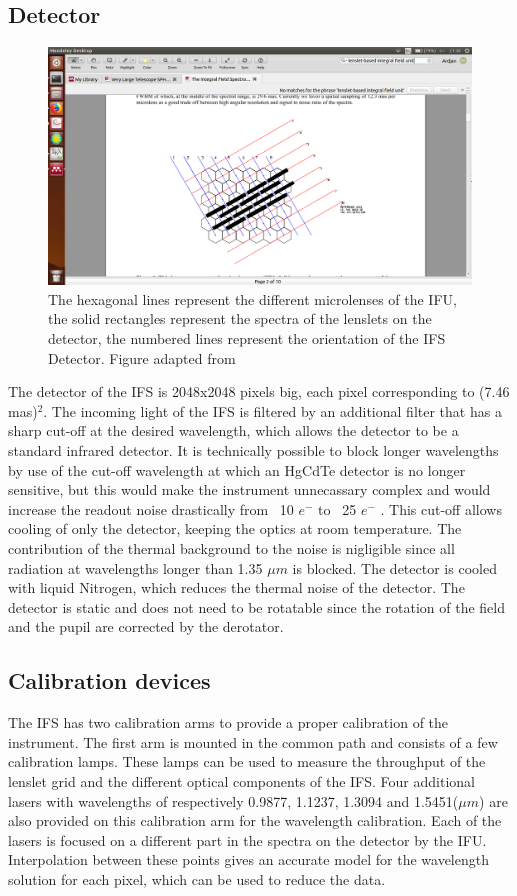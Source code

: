 \documentclass[twoside,single,12pt]{lion-msc}
\begin{document}
\subsection{Detector}
\begin{figure}[!b]
\centering 
\vspace{-0.5cm}
\includegraphics[trim={13cm 1.7cm 10cm 8cm},clip,width = 0.65\linewidth]{bigregrid}
\caption{The hexagonal lines represent the different microlenses of the IFU, the solid rectangles represent the spectra of the lenslets on the detector, the numbered lines  represent the orientation of the IFS Detector. Figure adapted from \cite{Claudi2006}} 
\label{fig:bigregrid}
\vspace{-0.5cm}
\end{figure}

The detector of the IFS is 2048x2048 pixels big, each pixel corresponding to (7.46 mas)$^2$. The incoming light of the IFS is filtered by an additional filter that has a sharp cut-off at the desired wavelength, which allows the detector to be a standard infrared detector. It is technically possible to block longer wavelengths by use of the cut-off wavelength at which an HgCdTe detector is no longer sensitive, but this would make the instrument unnecassary complex and would increase the readout noise drastically from ~10 $e^-$ to ~25 $e^-$ \citep{Claudi2006}. This cut-off allows cooling of only the detector, keeping the optics at room temperature. The contribution of the thermal background to the noise is nigligible since all radiation at wavelengths longer than 1.35 $\mu m$ is blocked. The detector is cooled with liquid Nitrogen, which reduces the thermal noise of the detector\citep{Claudi2006}. The detector is static and does not need to be rotatable since the rotation of the field and the pupil are corrected by the derotator. 

\subsection{Calibration devices}
The IFS has two calibration arms to provide a proper calibration of the instrument. The first arm is mounted in the common path and consists of a few calibration lamps. These lamps can be used to measure the throughput of the lenslet grid and the different optical components of the IFS. Four additional lasers with wavelengths of respectively 0.9877, 1.1237, 1.3094 and 1.5451($\mu m$) are also provided on this calibration arm for the wavelength calibration. Each of the lasers is focused on a different part in the spectra on the detector by the IFU. Interpolation between these points gives an accurate model for the wavelength solution for each pixel, which can be used to reduce the data.
\bigskip
\end{document}
